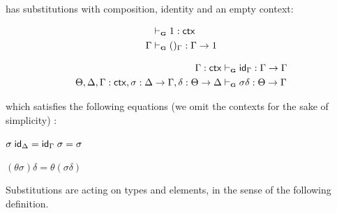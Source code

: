 \begin{definition}[Substitutions]
    \ThyGAT has substitutions with composition, identity and an empty context: 

    \noindent
    \begin{minipage}{0.35\linewidth}
        \begin{align*}
            &\vdashG 1 : \ctx\\
            \Gamma &\vdashG ()_\Gamma : \Gamma \rightarrow 1
        \end{align*}
    \end{minipage}
    \hfill
    \begin{minipage}{0.50\linewidth}
        \begin{align*}
            \Gamma : \ctx &\vdashG \Id_\Gamma : \Gamma \rightarrow \Gamma\\
            \Theta, \Delta, \Gamma : \ctx, \sigma : \Delta \rightarrow \Gamma, \delta : \Theta \rightarrow \Delta &\vdashG \sigma\delta : \Theta \rightarrow \Gamma
        \end{align*}
    \end{minipage}

    \vspace{1em}

    which satisfies the following equations (we omit the contexts for the sake of simplicity) :

    \begin{minipage}{0.40\linewidth}
        \centering
        $\sigma \; \mathsf{id}_\Delta = \mathsf{id}_\Gamma \; \sigma = \sigma$
    \end{minipage}
    \hfill
    \begin{minipage}{0.40\linewidth}
        \centering
        $(\theta \sigma)\delta = \theta (\sigma \delta)$
    \end{minipage}

\end{definition}

Substitutions are acting on types and elements, in the sense of the following definition.

